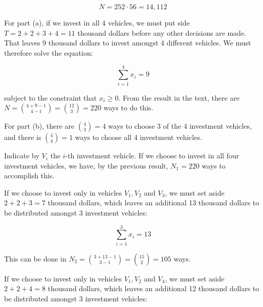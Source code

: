 \documentclass[a4paper,12pt]{article}
\begin{document}
\[ N = 252 \cdot 56 = 14,112 \]

\pagebreak
{}

For part (a), if we invest in all 4 vehicles, we must put side $T = 2 + 2 + 3 + 4 = 11$ thousand dollars before any other decisions are made. That leaves 9 thousand dollars to invest amongst 4 different vehicles. We must therefore solve the equation:

\[ \sum_{i=1}^4 x_i = 9\]

\noindent
subject to the constraint that $x_i \ge 0$. From the result in the text, there are $N = \binom{4+9-1}{4-1} = \binom{12}{3} = 220$ ways to do this. 

For part (b), there are $\binom{4}{3} = 4$ ways to choose 3 of the 4 investment vehicles, and there is $\binom{4}{4} = 1$ ways to choose all 4 investment vehicles. 

Indicate by $V_i$ the $i$-th investment vehicle. If we choose to invest in all four investment vehicles, we have, by the previous result, $N_1 = 220$ ways to accomplish this. 

If we choose to invest only in vehicles $V_1, V_2$ and $V_3$, we must set aside $2+2+3 = 7$ thousand dollars, which leaves an additional 13 thousand dollars to be distributed amongst 3 investment vehicles: 

\[ \sum_{i=1}^3 x_i = 13 \]

\noindent
This can be done in $N_2 = \binom{3+13-1}{3-1} = \binom{15}{2} = 105$ ways. 

If we choose to invest only in vehicles $V_1, V_2$ and $V_4$, we must set aside $2+2+4 = 8$ thousand dollars, which leaves an additional 12 thousand dollars to be distributed amongst 3 investment vehicles:
\end{document}
